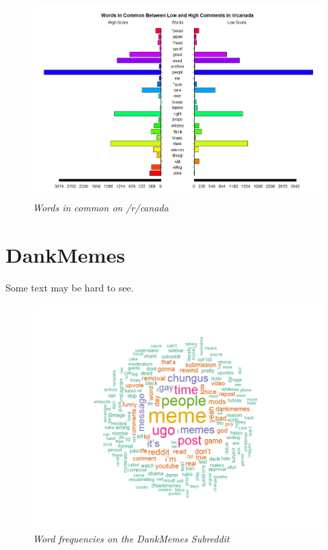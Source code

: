 \begin{figure}[H]
    \centering
    \includegraphics[width=1.0\textwidth]{graphs/Canada/pyramid_canada.png}
    \caption{\textit{Words in common on /r/canada}}
    \label{fig:canada_pyramid}
\end{figure}


\section{DankMemes}
\label{sec:dankmemes}
Some text may be hard to see.

\begin{figure}[ht]
    \centering
    \includegraphics[width=1.0\textwidth]{graphs/DankMemes/wordcloud_DankMemes.png}
    \caption{\textit{Word frequencies on the DankMemes Subreddit}}
    \label{fig:dankmemes_cloud}
\end{figure}

